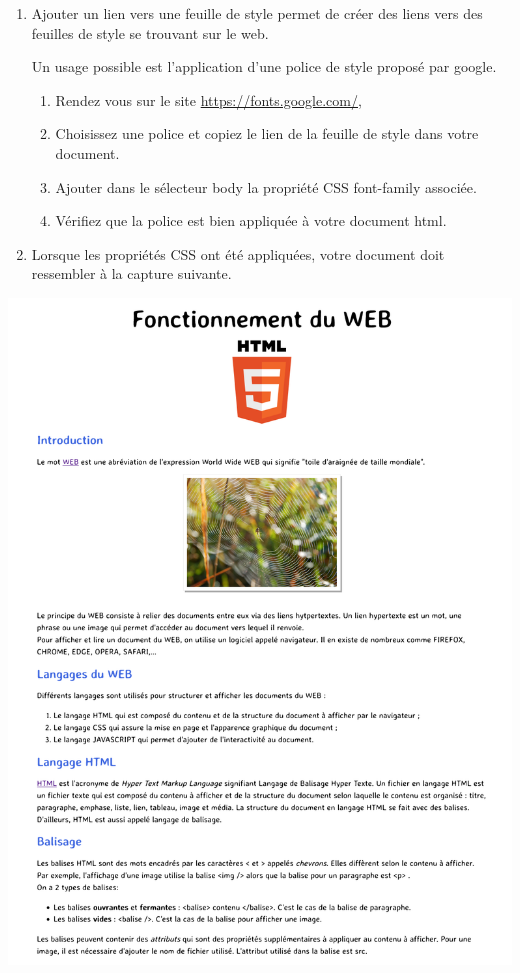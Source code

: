 \documentclass[12pt,a4paper]{article}
\begin{document}
\begin{enumerate}
\item Ajouter un lien vers une feuille de style permet de créer des liens vers des feuilles de style se trouvant sur le web.

Un usage possible est l'application d'une police de style proposé par google. 
\begin{enumerate}
\item Rendez vous sur le site \url{https://fonts.google.com/},
\item Choisissez une police et copiez le lien de la feuille de style dans votre document.
\item Ajouter dans le sélecteur \textsf{body} la propriété CSS \textsf{font-family} associée.
\item Vérifiez que la police est bien appliquée à votre document html.
\end{enumerate}

\item Lorsque les propriétés CSS ont été appliquées, votre document doit ressembler à la capture suivante.
\end{enumerate}

\newpage
\begin{center}
\includegraphics[scale=0.6]{img/activite_html.png}
\end{center}
\end{document}
